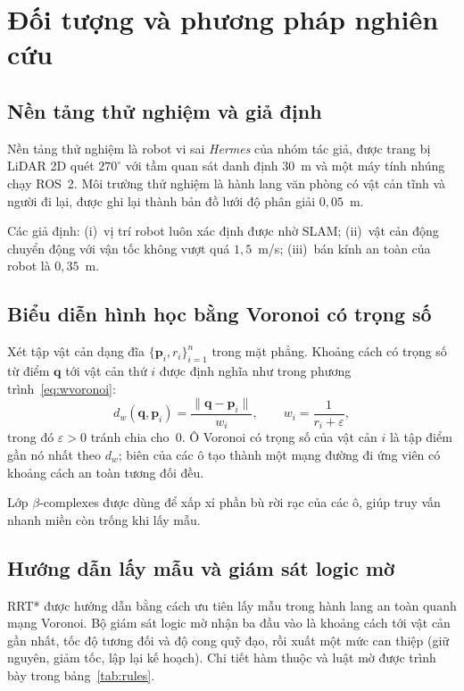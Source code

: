 
\section{Đối tượng và phương pháp nghiên cứu}

\subsection{Nền tảng thử nghiệm và giả định}

Nền tảng thử nghiệm là robot vi sai \textit{Hermes} của nhóm tác giả, được
trang bị LiDAR 2D quét $270^\circ$ với tầm quan sát danh định $30$~m và một
máy tính nhúng chạy ROS~2. Môi trường thử nghiệm là hành lang văn phòng có
vật cản tĩnh và người đi lại, được ghi lại thành bản đồ lưới độ phân giải
$0{,}05$~m.

Các giả định: (i)~vị trí robot luôn xác định được nhờ SLAM; (ii)~vật cản
động chuyển động với vận tốc không vượt quá $1{,}5$~m/s; (iii)~bán kính an
toàn của robot là $0{,}35$~m.

\subsection{Biểu diễn hình học bằng Voronoi có trọng số}

Xét tập vật cản dạng đĩa $\{\mathbf{p}_i, r_i\}_{i=1}^{n}$ trong mặt phẳng.
Khoảng cách có trọng số từ điểm $\mathbf{q}$ tới vật cản thứ $i$ được định
nghĩa như trong phương trình~\eqref{eq:wvoronoi}:
\begin{equation}
  d_w(\mathbf{q}, \mathbf{p}_i)
  = \frac{\lVert \mathbf{q} - \mathbf{p}_i \rVert}{w_i},
  \qquad w_i = \frac{1}{r_i + \varepsilon},
  \label{eq:wvoronoi}
\end{equation}
trong đó $\varepsilon > 0$ tránh chia cho~$0$. Ô Voronoi có trọng số của vật
cản $i$ là tập điểm gần nó nhất theo $d_w$; biên của các ô tạo thành một
mạng đường đi ứng viên có khoảng cách an toàn tương đối đều.

Lớp $\beta$-complexes được dùng để xấp xỉ phần bù rời rạc của các ô, giúp
truy vấn nhanh miền còn trống khi lấy mẫu.

\subsection{Hướng dẫn lấy mẫu và giám sát logic mờ}

RRT* được hướng dẫn bằng cách ưu tiên lấy mẫu trong hành lang an toàn quanh
mạng Voronoi. Bộ giám sát logic mờ nhận ba đầu vào là khoảng cách tới vật
cản gần nhất, tốc độ tương đối và độ cong quỹ đạo, rồi xuất một mức can
thiệp (giữ nguyên, giảm tốc, lập lại kế hoạch). Chi tiết hàm thuộc và luật
mờ được trình bày trong bảng~\ref{tab:rules}.

